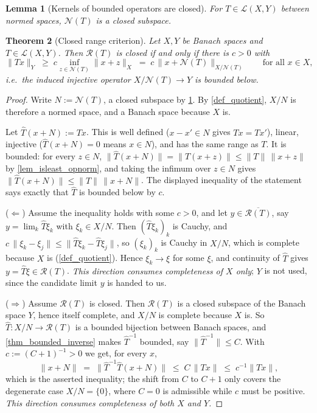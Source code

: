 \documentclass[a4paper]{report}
\theoremstyle{plain}
\newtheorem{theorem}{Theorem}[chapter]
\newtheorem{lemma}[theorem]{Lemma}
\theoremstyle{definition}
\theoremstyle{remark}
\begin{document}
\begin{lemma}[Kernels of bounded operators are closed]
  \label{lem_ker_closed}
  For $T \in \mathcal{L}(X,Y)$ between normed spaces, $\mathcal{N}(T)$ is a closed
  subspace.
\end{lemma}


\begin{theorem}[Closed range criterion]
  \label{thm_closed_range}
  Let $X,Y$ be Banach spaces and $T \in \mathcal{L}(X,Y)$.  Then $\mathcal{R}(T)$ is
  closed if and only if there is $c > 0$ with
  \[
    \|Tx\|_Y \;\ge\; c \inf_{z \in \mathcal{N}(T)} \|x + z\|_X
    \;=\; c\,\|x + \mathcal{N}(T)\|_{X/\mathcal{N}(T)}
    \qquad \text{for all } x \in X,
  \]
  i.e.\ the induced injective operator $X/\mathcal{N}(T) \to Y$ is bounded below.
\end{theorem}
\begin{proof}
  Write $N := \mathcal{N}(T)$, a closed subspace by \cref{lem_ker_closed}.  By
  \cref{def_quotient}, $X/N$ is therefore a normed space, and a Banach space because $X$
  is.

  Let $\hat T(x+N) := Tx$.  This is well defined ($x - x' \in N$ gives $Tx = Tx'$), linear,
  injective ($\hat T(x+N) = 0$ means $x \in N$), and has the same range as $T$.  It is
  bounded: for every $z \in N$, $\|\hat T(x+N)\| = \|T(x+z)\| \le \|T\|\,\|x+z\|$ by
  \cref{lem_isleast_opnorm}, and taking the infimum over $z \in N$ gives
  $\|\hat T(x+N)\| \le \|T\|\,\|x+N\|$.  The displayed inequality of the statement says
  exactly that $\hat T$ is bounded below by $c$.

  ($\Leftarrow$)  Assume the inequality holds with some $c > 0$, and let
  $y \in \overline{\mathcal{R}(T)}$, say $y = \lim_k \hat T\xi_k$ with $\xi_k \in X/N$.
  Then $(\hat T\xi_k)_k$ is Cauchy, and $c\,\|\xi_k - \xi_j\| \le \|\hat T\xi_k -
  \hat T\xi_j\|$, so $(\xi_k)_k$ is Cauchy in $X/N$, which is complete because $X$ is
  (\cref{def_quotient}).  Hence $\xi_k \to \xi$ for some $\xi$, and continuity of $\hat T$
  gives $y = \hat T\xi \in \mathcal{R}(T)$.  \emph{This direction consumes completeness of
  $X$ only}; $Y$ is not used, since the candidate limit $y$ is handed to us.

  ($\Rightarrow$)  Assume $\mathcal{R}(T)$ is closed.  Then $\mathcal{R}(T)$ is a closed
  subspace of the Banach space $Y$, hence itself complete, and $X/N$ is complete because
  $X$ is.  So $\hat T \colon X/N \to \mathcal{R}(T)$ is a bounded bijection between Banach
  spaces, and \cref{thm_bounded_inverse} makes $\hat T^{-1}$ bounded, say
  $\|\hat T^{-1}\| \le C$.  With $c := (C+1)^{-1} > 0$ we get, for every $x$,
  \[
    \|x+N\| \;=\; \bigl\|\hat T^{-1}\hat T(x+N)\bigr\| \;\le\; C\,\|Tx\|
      \;\le\; c^{-1}\|Tx\| ,
  \]
  which is the asserted inequality; the shift from $C$ to $C+1$ only covers the degenerate
  case $X/N = \{0\}$, where $C = 0$ is admissible while $c$ must be positive.
  \emph{This direction consumes completeness of both $X$ and $Y$.}


\end{proof}
\end{document}

